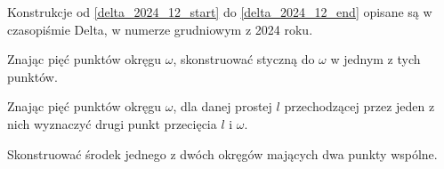 Konstrukcje od \ref{delta_2024_12_start} do \ref{delta_2024_12_end} opisane są w czasopiśmie Delta, w numerze grudniowym z 2024 roku.

\begin{geoconstruction}
    \label{delta_2024_12_start}
    Znając pięć punktów okręgu $\omega$, skonstruować styczną do $\omega$ w jednym z tych punktów.
\end{geoconstruction}

\begin{geoconstruction}
    Znając pięć punktów okręgu $\omega$, dla danej prostej $l$ przechodzącej przez jeden z nich wyznaczyć drugi punkt przecięcia $l$ i $\omega$.
\end{geoconstruction}


\begin{geoconstruction}
    Skonstruować środek jednego z dwóch okręgów mających dwa punkty wspólne.
\end{geoconstruction}

